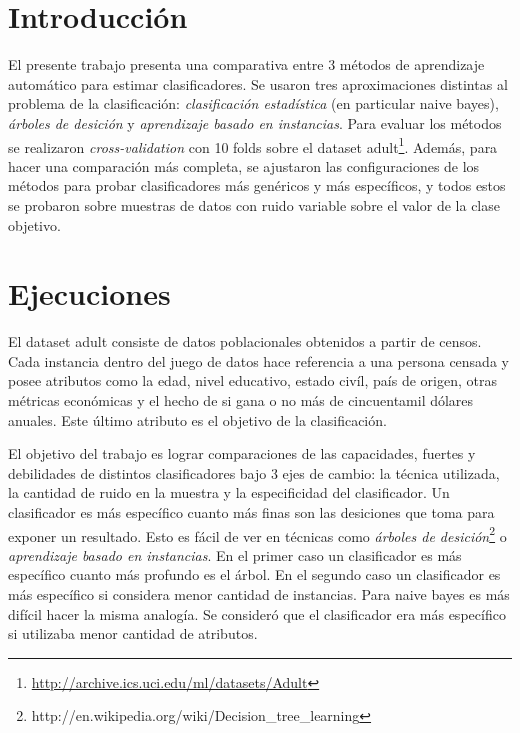 \documentclass[a4paper,10pt]{article}
\begin{document}



\maketitle
\tableofcontents
\newpage

\section{Introducción}

El presente trabajo presenta una comparativa entre 3 métodos de aprendizaje automático para estimar clasificadores. Se usaron tres aproximaciones distintas al problema de la clasificación: \emph{clasificación estadística} (en particular \textsf{naive bayes}), \emph{árboles de desición} y \emph{aprendizaje basado en instancias}. Para evaluar los métodos se realizaron \emph{cross-validation} con 10 folds sobre el dataset \textsf{adult}\footnote{\url{http://archive.ics.uci.edu/ml/datasets/Adult}}. Además, para hacer una comparación más completa, se ajustaron las configuraciones de los métodos para probar clasificadores más genéricos y más específicos, y todos estos se probaron sobre muestras de datos con ruido variable sobre el valor de la clase objetivo. 

\section{Ejecuciones}

El dataset \textsf{adult} consiste de datos poblacionales obtenidos a partir de censos. Cada instancia dentro del juego de datos hace referencia a una persona censada y posee atributos como la edad, nivel educativo, estado civíl, país de origen, otras métricas económicas y el hecho de si gana o no más de cincuentamil dólares anuales. Este último atributo es el objetivo de la clasificación.

El objetivo del trabajo es lograr comparaciones de las capacidades, fuertes y debilidades de distintos clasificadores bajo 3 ejes de cambio: la técnica utilizada, la cantidad de ruido en la muestra y la especificidad del clasificador. Un clasificador es más específico cuanto más finas son las desiciones que toma para exponer un resultado. Esto es fácil de ver en técnicas como \emph{árboles de desición}\footnote{http://en.wikipedia.org/wiki/Decision\_tree\_learning} o \emph{aprendizaje basado en instancias}. En el primer caso un clasificador es más específico cuanto más profundo es el árbol. En el segundo caso un clasificador es más específico si considera menor cantidad de instancias.
Para \textsf{naive bayes} es más difícil hacer la misma analogía. Se consideró que el clasificador era más específico si utilizaba menor cantidad de atributos.
\end{document}
